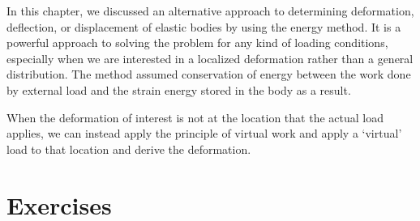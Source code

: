 \documentclass[
fontsize=10pt,
a4paper,
twosides=false,
open=any,
svgnames,
]{kaobook} %
\begin{document}
In this chapter, we discussed an alternative approach to determining deformation, deflection, or displacement of elastic bodies by using the energy method. It is a powerful approach to solving the problem for any kind of loading conditions, especially when we are interested in a localized deformation rather than a general distribution. The method assumed conservation of energy between the work done by external load and the strain energy stored in the body as a result.

When the deformation of interest is not at the location that the actual load applies, we can instead apply the principle of virtual work and apply a `virtual' load to that location and derive the deformation.

\section*{Exercises}
\end{document}

